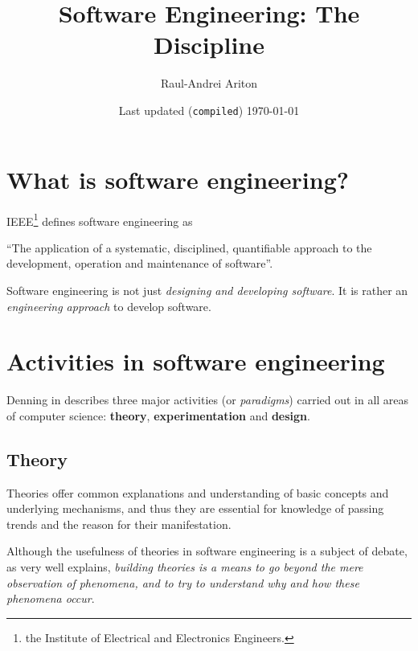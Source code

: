\documentclass[a4paper]{article}
\begin{document}
    \begin{titlepage}
        \title{Software Engineering: The Discipline}
        \author{Raul-Andrei Ariton}
        \date{Last updated (\texttt{compiled}) \today}
        \maketitle
    \end{titlepage}

    \tableofcontents

    \newpage
    
    \section{What is software engineering?}

        IEEE\footnote{the Institute of Electrical and Electronics Engineers.} defines software engineering as

        ``The application of a systematic, disciplined, quantifiable approach to the development, operation and maintenance of software''.

        Software engineering is not just \emph{designing and developing software}. It is rather an \emph{engineering approach} to develop software\supercite{mall2018fundamentals}.

    \section{Activities in software engineering}

        Denning in \cite{denning2000computer} describes three major activities (or \emph{paradigms}) carried out in all areas of computer science: \textbf{theory}, \textbf{experimentation} and \textbf{design}.

        \subsection{Theory}

            Theories offer common explanations and understanding of basic concepts and underlying mechanisms, and thus they are essential for knowledge of passing trends and the reason for their manifestation\supercite{hannaysestematic}. 

            Although the usefulness of theories in software engineering is a subject of debate, as \cite{hannaysestematic} very well explains, \emph{building theories is a means to go beyond the mere observation of phenomena, and to try to understand \emph{why} and \emph{how} these phenomena occur}.
\end{document}
